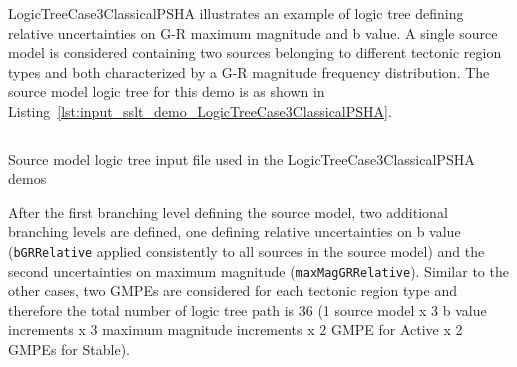 LogicTreeCase3ClassicalPSHA illustrates an example of logic tree defining
relative uncertainties on G-R maximum magnitude and b value. A single source
model is considered containing two sources belonging to different tectonic
region types and both characterized by a G-R magnitude frequency distribution.
The source model logic tree for this demo is as shown in
Listing~\ref{lst:input_sslt_demo_LogicTreeCase3ClassicalPSHA}.

\begin{listing}[htbp]
  \inputminted[firstline=1,firstnumber=1,fontsize=\footnotesize,frame=single,linenos,bgcolor=lightgray]{xml}{oqum/hazard/verbatim/input_sslt_demo_LogicTreeCase3ClassicalPSHA.xml}
  \caption{Source model logic tree input file used in the LogicTreeCase3ClassicalPSHA demos}
  \label{lst:input_sslt_demo_LogicTreeCase3ClassicalPSHA}
\end{listing}

After the first branching level defining the source model, two additional
branching levels are defined, one defining relative uncertainties on b value
(\texttt{bGRRelative} applied consistently to all sources in the source
model) and the second uncertainties on maximum magnitude
(\texttt{maxMagGRRelative}). Similar to the other cases, two GMPEs are
considered for each tectonic region type and therefore the total number of
logic tree path is 36 (1 source model x 3 b value increments x 3 maximum
magnitude increments x 2 GMPE for Active x 2 GMPEs for Stable).